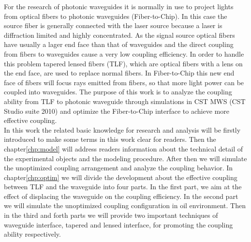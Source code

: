 
For the research of photonic waveguides it is normally in use to project lights from optical fibers to photonic waveguides (Fiber-to-Chip). In this case the source fiber is generally connected with the laser source because a laser is diffraction limited and highly concentrated. As the signal source optical fibers have usually a lager end face than that of waveguides and the direct coupling from fibers to waveguides cause a very low coupling efficiency. In order to handle this problem tapered lensed fibers (TLF), which are optical fibers with a lens on the end face, are used to replace normal fibers. In Fiber-to-Chip  this new end face of fibers will focus rays emitted from fibers, so that more light power can be coupled into waveguides. The purpose of this work is to analyze the coupling ability from TLF to photonic waveguide through simulations in CST MWS  (CST Studio suite 2010) and optimize the Fiber-to-Chip interface to achieve more effective coupling.\\
In this work the related basic knowledge for research and analysis will be firstly introduced to make some terms in this work clear for readers. Then the chapter\ref{chp:model} will address readers information about the technical detail of the experimental objects and the modeling procedure. After then we will simulate the unoptimized coupling arrangement and analyze the coupling behavior. In chapter\ref{chp:optim} we will divide the development about the effective coupling between TLF and the waveguide  into four parts. In the first part, we aim at the effect of displacing the waveguide on the coupling efficiency. In the second part we will simulate the unoptimized coupling configuration in oil environment. Then in the third and forth parts we will provide two important techniques of waveguide interface, tapered and lensed interface, for promoting the coupling ability respectively.\\  
